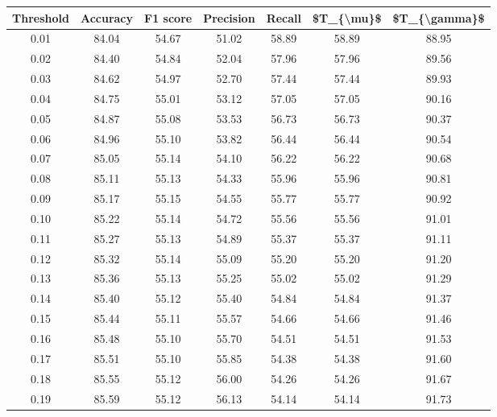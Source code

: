 \begin{tabular}{|c|c|c|c|c|c|c|}
\hline
 Threshold &  Accuracy &  F1 score &  Precision &  Recall &  \$T\_\{\textbackslash mu\}\$ &  \$T\_\{\textbackslash gamma\}\$ \\
\hline
      0.01 &     84.04 &     54.67 &      51.02 &   58.89 &      58.89 &         88.95 \\
      0.02 &     84.40 &     54.84 &      52.04 &   57.96 &      57.96 &         89.56 \\
      0.03 &     84.62 &     54.97 &      52.70 &   57.44 &      57.44 &         89.93 \\
      0.04 &     84.75 &     55.01 &      53.12 &   57.05 &      57.05 &         90.16 \\
      0.05 &     84.87 &     55.08 &      53.53 &   56.73 &      56.73 &         90.37 \\
      0.06 &     84.96 &     55.10 &      53.82 &   56.44 &      56.44 &         90.54 \\
      0.07 &     85.05 &     55.14 &      54.10 &   56.22 &      56.22 &         90.68 \\
      0.08 &     85.11 &     55.13 &      54.33 &   55.96 &      55.96 &         90.81 \\
      0.09 &     85.17 &     55.15 &      54.55 &   55.77 &      55.77 &         90.92 \\
      0.10 &     85.22 &     55.14 &      54.72 &   55.56 &      55.56 &         91.01 \\
      0.11 &     85.27 &     55.13 &      54.89 &   55.37 &      55.37 &         91.11 \\
      0.12 &     85.32 &     55.14 &      55.09 &   55.20 &      55.20 &         91.20 \\
      0.13 &     85.36 &     55.13 &      55.25 &   55.02 &      55.02 &         91.29 \\
      0.14 &     85.40 &     55.12 &      55.40 &   54.84 &      54.84 &         91.37 \\
      0.15 &     85.44 &     55.11 &      55.57 &   54.66 &      54.66 &         91.46 \\
      0.16 &     85.48 &     55.10 &      55.70 &   54.51 &      54.51 &         91.53 \\
      0.17 &     85.51 &     55.10 &      55.85 &   54.38 &      54.38 &         91.60 \\
      0.18 &     85.55 &     55.12 &      56.00 &   54.26 &      54.26 &         91.67 \\
      0.19 &     85.59 &     55.12 &      56.13 &   54.14 &      54.14 &         91.73 \\

\end{tabular}

